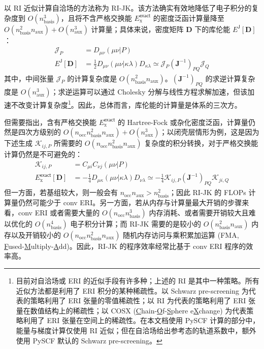 以 RI 近似计算自洽场的方法称为 RI-JK。该方法确实有效地降低了电子积分的复杂度到 $O(n_\mathrm{basis}^3)$，且将不含严格交换能 $E_\mathrm{x}^\textsf{exact}$ 的密度泛函计算量降至 $O(n_\mathrm{basis}^2 n_\mathrm{aux}) + O(n_\mathrm{aux}^3)$ 计算量；具体来说，密度矩阵 $\mathbf{D}$ 下的库伦能 $E^\textsf{J} [\mathbf{D}]$：
\begin{align*}
  \mathcal{J}_P &= D_{\mu \nu} (\mu \nu | P) \\
  E^\textsf{J} [\mathbf{D}] &= \frac{1}{2} D_{\mu \nu} (\mu \nu | \kappa \lambda) D_{\kappa \lambda} \simeq \mathcal{J}_P (\mathbf{J}^{-1})_{PQ} \mathcal{J}_Q
\end{align*}
其中，中间张量 $\mathcal{J}_P$ 的计算复杂度是 $O(n_\mathrm{basis}^2 n_\mathrm{aux})$。$(\mathbf{J}^{-1})_{PQ}$ 的求逆计算复杂度是 $O(n_\mathrm{aux}^3)$；求逆运算可以通过 Cholesky 分解与线性方程求解加速，但该加速不改变计算复杂度\footnote{目前对自洽场或 ERI 的近似手段有许多种；上述的 RI 是其中一种策略。所有近似方法都是利用了 ERI 积分的某种稀疏性。以 Schwarz pre-screening 为代表的策略利用了 ERI 张量的零值稀疏性\cite{Horn-Ahlrichs.JCC.1991}；以 RI 为代表的策略利用了 ERI 张量在数值结构上的稀疏性\cite{Vahtras-Feyereisen.CPL.1993}；以 COSX (\underline{C}hain-\underline{O}f-\underline{S}phere e\underline{X}change) 为代表策略利用了 ERI 张量在空间上的稀疏性\cite{Neese-Becker.CP.2009}。在本文档使用 PySCF 计算的部分中，能量与梯度计算仅使用 RI 近似；但在自洽场给出参考态的轨道系数中，额外使用 PySCF 默认的 Schwarz pre-screening。}。因此，总体而言，库伦能的计算量是体系的三次方。

但需要指出，含有严格交换能 $E_\mathrm{x}^\textsf{exact}$ 的 Hartree-Fock 或杂化密度泛函，计算量仍然是四次方级别的 $O(n_\mathrm{occ} n_\mathrm{basis}^2 n_\mathrm{aux}) + O(n_\mathrm{aux}^3)$；以闭壳层情形为例，这是因为下述生成 $\mathcal{K}_{ij, P}$ 所需要的 $O(n_\mathrm{occ} n_\mathrm{basis}^2 n_\mathrm{aux})$ 复杂度的积分转换，对于严格交换能计算仍然是不可避免的：
\begin{align*}
  \mathcal{K}_{ij, P} &= C_{\mu i} C_{\nu j} (\mu \nu | P) \\
  E_\mathrm{x}^\textsf{exact} [\mathbf{D}] &= - \frac{1}{4} D_{\mu \kappa} (\mu \nu | \kappa \lambda) D_{\nu \lambda} \simeq - \frac{1}{4} \mathcal{K}_{ij, P} (\mathbf{J}^{-1})_{PQ} \mathcal{K}_{ji, Q}
\end{align*}
但一方面，若基组较大，则一般会有 $n_\mathrm{occ} n_\mathrm{aux} > n_\mathrm{basis}^2$；因此 RI-JK 的 FLOPs 计算量仍然可能少于 conv ERI。另一方面，若从内存与计算量最大开销的步骤来看，conv ERI 或者需要大量的 $O(n_\mathrm{occ} n_\mathrm{basis}^3)$ 内存消耗、或者需要开销较大且难以优化的 $O(n_\mathrm{basis}^4)$ 电子积分计算；而 RI-JK 需要的是较小的 $O(n_\mathrm{basis}^2 n_\mathrm{aux})$ 内存以及开销较小的 $O(n_\mathrm{occ} n_\mathrm{basis}^2 n_\mathrm{aux})$ 随机内存访问与乘积累加运算 (FMA, \underline{F}used-\underline{M}ultiply-\underline{A}dd)。因此，RI-JK 的程序效率经常比基于 conv ERI 程序的效率高。


